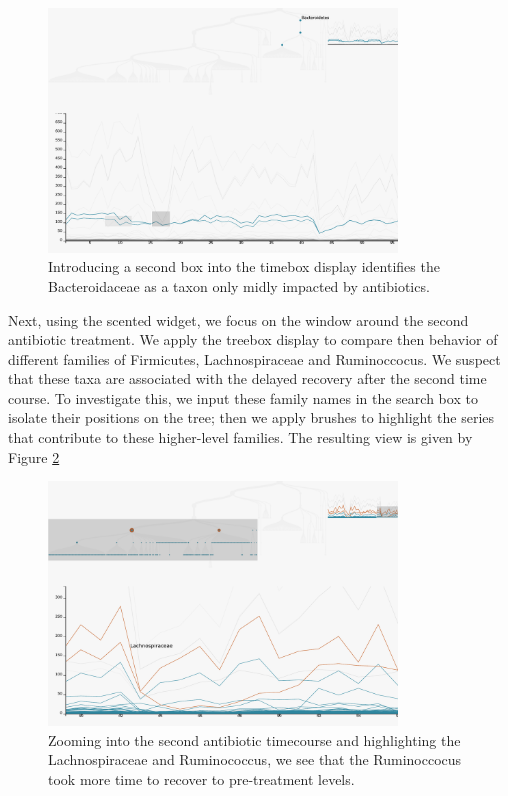 \documentclass[12pt]{article}
\begin{document}
\begin{figure}

{\centering \includegraphics[width=350px]{figure/antibiotic_bacteroidetes}

}

\caption{Introducing a second box into the timebox display identifies the Bacteroidaceae as a taxon only midly impacted by antibiotics.}\label{fig:antibioticbacteroidetes}
\end{figure}

Next, using the scented widget, we focus on the window around the second
antibiotic treatment. We apply the treebox display to compare then behavior of
different families of Firmicutes, Lachnospiraceae and Ruminoccocus. We suspect
that these taxa are associated with the delayed recovery after the second time
course. To investigate this, we input these family names in the search box to
isolate their positions on the tree; then we apply brushes to highlight the
series that contribute to these higher-level families. The resulting view is
given by Figure \ref{fig:antibioticfirmicutes}

\begin{figure}
{\centering \includegraphics[width=350px]{figure/antibiotic_firmicutes}

}

\caption{Zooming into the second antibiotic timecourse and highlighting the Lachnospiraceae and Ruminococcus, we see that the Ruminoccocus took more time to recover to pre-treatment levels.}\label{fig:antibioticfirmicutes}
\end{figure}
\end{document}
